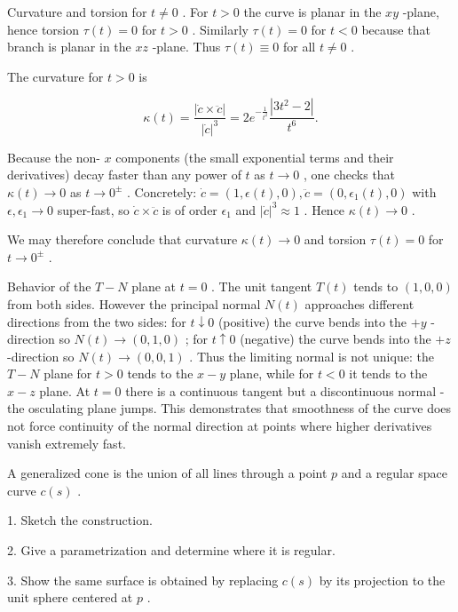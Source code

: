 \documentclass[10pt]{article}
\begin{document}
Curvature and torsion for \(t \neq  0\) . For \(t > 0\) the curve is planar in the \({xy}\) -plane, hence torsion \(\tau \left( t\right)  = 0\) for \(t > 0\) . Similarly \(\tau \left( t\right)  = 0\) for \(t < 0\) because that branch is planar in the \({xz}\) -plane. Thus \(\tau \left( t\right)  \equiv  0\) for all \(t \neq  0\) .

The curvature for \(t > 0\) is

\[
\kappa \left( t\right)  = \frac{\left| \dot{c} \times  \ddot{c}\right| }{{\left| \dot{c}\right| }^{3}} = 2{e}^{-\frac{1}{{t}^{2}}}\frac{\left| 3{t}^{2} - 2\right| }{{t}^{6}}.
\]

Because the non- \(x\) components (the small exponential terms and their derivatives) decay faster than any power of \(t\) as \(t \rightarrow  0\) , one checks that \(\kappa \left( t\right)  \rightarrow  0\) as \(t \rightarrow  {0}^{ \pm  }\) . Concretely: \(\dot{c} = \left( {1,\epsilon \left( t\right) ,0}\right) ,\ddot{c} = \left( {0,{\epsilon }_{1}\left( t\right) ,0}\right)\) with \(\epsilon ,{\epsilon }_{1} \rightarrow  0\) super-fast, so \(\dot{c} \times  \ddot{c}\) is of order \({\epsilon }_{1}\) and \({\left| \dot{c}\right| }^{3} \approx  1\) . Hence \(\kappa \left( t\right)  \rightarrow  0\) .

We may therefore conclude that curvature \(\kappa \left( t\right)  \rightarrow  0\) and torsion \(\tau \left( t\right)  = 0\) for \(t \rightarrow  {0}^{ \pm  }\) .

Behavior of the \(T - N\) plane at \(t = 0\) . The unit tangent \(T\left( t\right)\) tends to \(\left( {1,0,0}\right)\) from both sides. However the principal normal \(N\left( t\right)\) approaches different directions from the two sides: for \(t \downarrow  0\) (positive) the curve bends into the \(+ y\) -direction so \(N\left( t\right)  \rightarrow  \left( {0,1,0}\right)\) ; for \(t \uparrow  0\) (negative) the curve bends into the \(+ z\) -direction so \(N\left( t\right)  \rightarrow  \left( {0,0,1}\right)\) . Thus the limiting normal is not unique: the \(T - N\) plane for \(t > 0\) tends to the \(x - y\) plane, while for \(t < 0\) it tends to the \(x - z\) plane. At \(t = 0\) there is a continuous tangent but a discontinuous normal -the osculating plane jumps. This demonstrates that smoothness of the curve does not force continuity of the normal direction at points where higher derivatives vanish extremely fast.

\begin{problem}[title=PROBLEM 5 (6 POINTS)]
A generalized cone is the union of all lines through a point \(p\) and a regular space curve \(c\left( s\right)\) .

1. Sketch the construction.

2. Give a parametrization and determine where it is regular.

3. Show the same surface is obtained by replacing \(c\left( s\right)\) by its projection to the unit sphere centered at \(p\) .
\end{problem}
\end{document}
